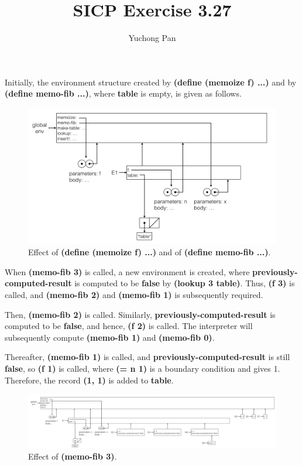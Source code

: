 \documentclass[11pt, oneside]{article}
\title{SICP Exercise 3.27}
\author{Yuchong Pan}
\begin{document}
\maketitle

Initially, the environment structure created by \textbf{(define (memoize f) ...)} and by \textbf{(define memo-fib ...)}, where \textbf{table} is empty, is given as follows.

\begin{figure}[h!]
    \centering\includegraphics[width=15cm]{ex-3.27-1.png}
    \caption{Effect of \textbf{(define (memoize f) ...)} and of \textbf{(define memo-fib ...)}.}
\end{figure}

When \textbf{(memo-fib 3)} is called, a new environment is created, where \textbf{previously-computed-result} is computed to be \textbf{false} by \textbf{(lookup 3 table)}. Thus, \textbf{(f 3)} is called, and \textbf{(memo-fib 2)} and \textbf{(memo-fib 1)} is subsequently required.

Then, \textbf{(memo-fib 2)} is called. Similarly, \textbf{previously-computed-result} is computed to be \textbf{false}, and hence, \textbf{(f 2)} is called. The interpreter will subsequently compute \textbf{(memo-fib 1)} and \textbf{(memo-fib 0)}.

Thereafter, \textbf{(memo-fib 1)} is called, and \textbf{previously-computed-result} is still \textbf{false}, so \textbf{(f 1)} is called, where \textbf{(= n 1)} is a boundary condition and gives 1. Therefore, the record \textbf{(1, 1)} is added to \textbf{table}.

\begin{figure}[h!]
    \centering\includegraphics[width=15cm]{ex-3.27-2.png}
    \caption{Effect of \textbf{(memo-fib 3)}.}
\end{figure}
\end{document}
